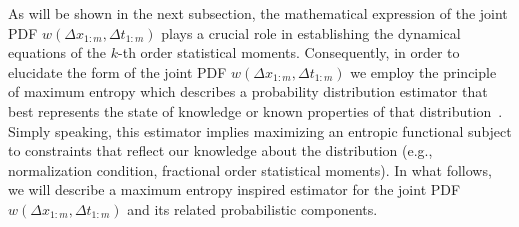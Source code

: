 

As will be shown in the next subsection, the mathematical expression of the joint PDF $w(\Delta x_{1:m},\Delta t_{1:m})$ plays a crucial role in establishing the dynamical equations of the $k$-th order statistical moments. Consequently, in order to elucidate the form of the joint PDF $w(\Delta x_{1:m},\Delta t_{1:m})$ we employ the principle of maximum entropy which describes a probability distribution estimator that best represents the state of knowledge or known properties of that distribution~\cite{montroll1983maximum}. Simply speaking, this estimator implies maximizing an entropic functional subject to constraints that reflect our knowledge about the distribution (e.g., normalization condition, fractional order statistical moments). In what follows, we will describe a maximum entropy inspired estimator for the joint PDF $w(\Delta x_{1:m},\Delta t_{1:m})$ and its related probabilistic components.

